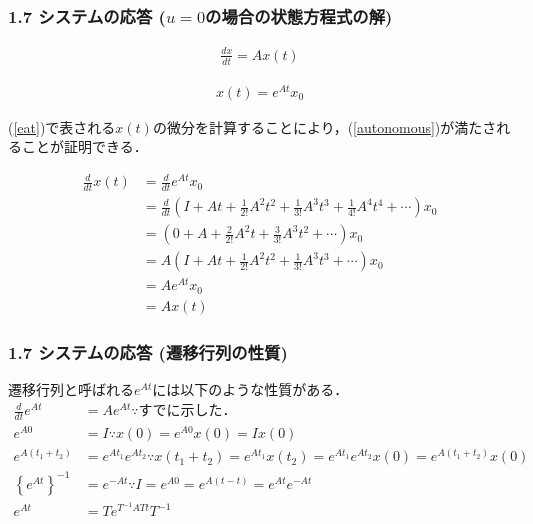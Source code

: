 \documentclass[10pt]{beamer}
\begin{document}
\begin{frame}[t]
\frametitle{1.7 システムの応答 ($u=0$の場合の状態方程式の解)}
 

\begin{align}
\frac{dx}{dt} = Ax(t) 
\end{align}
 

\begin{align}
 x(t) = e^{At} x_0 
\end{align}

(\ref{eat})で表される$x(t)$の微分を計算することにより，(\ref{autonomous})が満たされることが証明できる．
 
\begin{align}
 \frac{d}{dt}x(t)
 &= \frac{d}{dt}e^{At} x_0 \\
 &= \frac{d}{dt}
 \left(I + At + \frac{1}{2!} A^2 t^2 + \frac{1}{3!} A^3 t^3 +
 \frac{1}{4!} A^4 t^4 + \cdots\right)x_0 \nonumber \\
 &= \left(0 + A + \frac{2}{2!} A^2 t + \frac{3}{3!} A^3 t^2 +
 \cdots\right)x_0 \nonumber \\
 &= A
 \left(I + At + \frac{1}{2!} A^2 t^2 + \frac{1}{3!} A^3 t^3 + \cdots
 \right)x_0 \nonumber \\
 &= A e^{At} x_0 \nonumber \\
 &= Ax(t)
\end{align}
\end{frame}


\begin{frame}[t]
\frametitle{1.7 システムの応答 (遷移行列の性質)}
遷移行列と呼ばれる$e^{At}$には以下のような性質がある．
\begin{align}
 \frac{d}{dt} e^{At} &= A e^{At}
           
          \because \mbox{すでに示した．}\\
 e^{A 0}          &= I
            
           \because x(0) = e^{A0}x(0) = I x(0) \\
 e^{A(t_1 + t_2)} &= e^{At_1} e^{A t_2}
            
           \because x(t_1+t_2) = e^{At_1}x(t_2) = e^{At_1} e^{At_2} x(0)
                  = e^{A(t_1+t_2)}x(0)\\
 \left \{ e^{At} \right \}^{-1} & = e^{-At}
           
          \because I = e^{A0} = e^{A(t-t)} = e^{At}e^{-At}\\
 e^{At}           &= T e^{T^{-1}AT t} T^{-1}
 
\end{align}
\end{frame}
\end{document}
